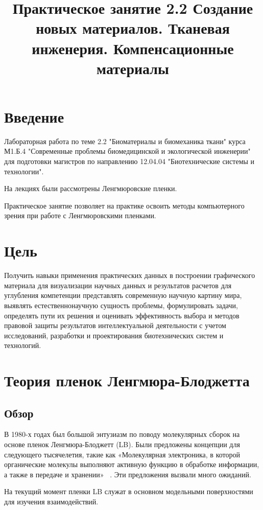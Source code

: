 \documentclass[11pt]{article}
\title{Практическое занятие 2.2 Создание новых материалов. Тканевая инженерия. Компенсационные материалы}
\begin{document}
    
    \maketitle
    
\tableofcontents{}
    
\section{Введение}
Лабораторная работа по теме 2.2 "Биоматериалы и биомеханика ткани" курса М1.Б.4 "Современные проблемы биомедицинской и экологической инженерии" для подготовки магистров по направлению 12.04.04 "Биотехнические системы и технологии".

На лекциях были рассмотрены Ленгмюровские пленки.

Практическое занятие позволяет на практике освоить методы компьютерного зрения при работе с Ленгмюровскими пленками. 


\section{Цель}
Получить навыки применения практических данных в построении графического материала для визуализации научных данных и результатов расчетов для углубления компетенции представлять современную научную картину мира, выявлять естественнонаучную сущность проблемы, формулировать задачи, определять пути их решения и оценивать эффективность выбора и методов правовой защиты результатов интеллектуальной деятельности с учетом исследований, разработки и проектирования биотехнических систем и технологий.
\section{Теория пленок Ленгмюра-Блоджетта}    

\subsection{Обзор}    
В 1980-х годах был большой энтузиазм по поводу молекулярных сборок на основе пленок Ленгмюра-Блоджетт (LB). Были предложены концепции для следующего тысячелетия, такие как «Молекулярная электроника, в которой органические молекулы выполняют активную функцию в обработке информации, а также в передаче и хранении» ~\cite{c1,c2,c3}. Эти предложения вызвали много ожиданий. 

На текущий момент пленки LB служат в основном модельными поверхностями для изучения взаимодействий.
  
\end{document}
